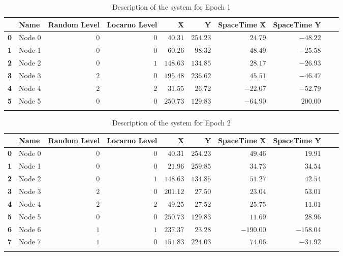 \documentclass[a4paper,11pt,twoside,openright]{report}
\begin{document}
\begin{table}[h]
\centering
\tiny
\begin{tabular}{@{}llrrrrrrll@{}}
\toprule
& \textbf{Name}   &\textbf{Random Level} &\textbf{Locarno Level} & \textbf{X} & \textbf{Y} & \textbf{SpaceTime X} & \textbf{SpaceTime Y}  \\ \midrule
\textbf{0} & Node 0&$0$&$0$&$40.31$&$254.23$&$24.79$&$-48.22$&\\ \hdashline
\textbf{1} & Node 1&$0$&$0$&$60.26$&$98.32$&$48.49$&$-25.58$&\\ \hdashline
\textbf{2} & Node 2&$0$&$1$&$148.63$&$134.85$&$28.17$&$-26.93$&\\ \hdashline
\textbf{3} & Node 3&$2$&$0$&$195.48$&$236.62$&$45.51$&$-46.47$&\\ \hdashline
\textbf{4} & Node 4&$2$&$2$&$31.55$&$26.72$&$-22.07$&$-52.79$&\\ \hdashline
\textbf{5} & Node 5&$0$&$0$&$250.73$&$129.83$&$-64.90$&$200.00$&\\ \hdashline\midrule
\bottomrule
\end{tabular}
\caption{Description of the system for Epoch 1}
\end{table}


\begin{table}[h]
\centering
\tiny
\begin{tabular}{@{}llrrrrrrll@{}}
\toprule
& \textbf{Name}   &\textbf{Random Level} &\textbf{Locarno Level} & \textbf{X} & \textbf{Y} & \textbf{SpaceTime X} & \textbf{SpaceTime Y}  \\ \midrule
\textbf{0} & Node 0&$0$&$0$&$40.31$&$254.23$&$49.46$&$19.91$&\\ \hdashline
\textbf{1} & Node 1&$0$&$0$&$21.96$&$259.85$&$34.73$&$34.54$&\\ \hdashline
\textbf{2} & Node 2&$0$&$1$&$148.63$&$134.85$&$51.27$&$42.54$&\\ \hdashline
\textbf{3} & Node 3&$2$&$0$&$201.12$&$27.50$&$23.04$&$53.01$&\\ \hdashline
\textbf{4} & Node 4&$2$&$2$&$49.25$&$27.52$&$25.75$&$11.01$&\\ \hdashline
\textbf{5} & Node 5&$0$&$0$&$250.73$&$129.83$&$11.69$&$28.96$&\\ \hdashline
\textbf{6} & Node 6&$1$&$1$&$237.37$&$23.28$&$-190.00$&$-158.04$&\\ \hdashline
\textbf{7} & Node 7&$1$&$0$&$151.83$&$224.03$&$74.06$&$-31.92$&\\ \hdashline\midrule
\bottomrule
\end{tabular}
\caption{Description of the system for Epoch 2}
\end{table}
\end{document}
